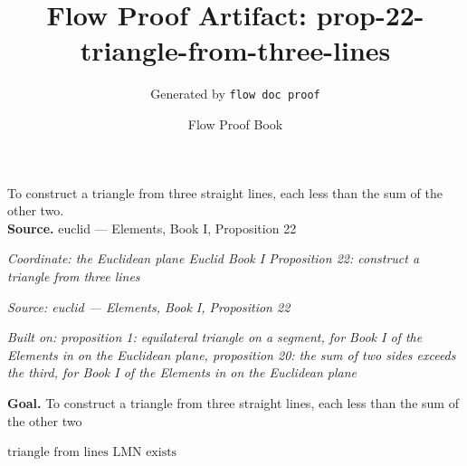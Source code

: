 \documentclass[11pt]{article}
\title{Flow Proof Artifact: prop-22-triangle-from-three-lines}
\author{Generated by \texttt{flow doc proof}}
\date{Flow Proof Book}
\theoremstyle{definition}
\begin{document}
\maketitle
To construct a triangle from three straight lines, each less than the sum of the other two.\\[0.5em]
\textbf{Source.} euclid — Elements, Book I, Proposition 22\\[0.5em]
\bigskip
{}\par
\smallskip\noindent\textit{Coordinate: the Euclidean plane \cdot Euclid Book I \cdot Proposition 22: construct a triangle from three lines}\par
\smallskip\noindent\textit{Source: euclid — Elements, Book I, Proposition 22}\par
\smallskip\noindent\textit{Built on: proposition 1: equilateral triangle on a segment, for Book I of the Elements in on the Euclidean plane, proposition 20: the sum of two sides exceeds the third, for Book I of the Elements in on the Euclidean plane}\par
\medskip
\noindent\textbf{Goal.} To construct a triangle from three straight lines, each less than the sum of the other two\par
\noindent$\displaystyle \text{triangle from lines LMN exists}$\par
\medskip
\noindent
\end{document}
